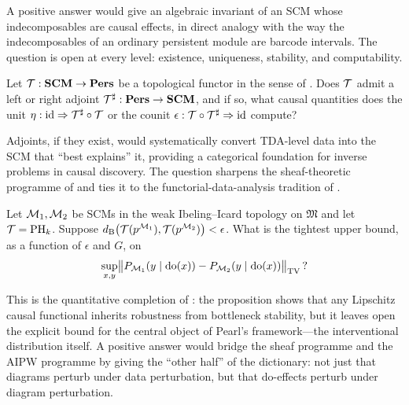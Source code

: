 A positive answer would give an algebraic invariant of an SCM whose
indecomposables are causal effects, in direct analogy with the way the
indecomposables of an ordinary persistent module are barcode intervals.
The question is open at every level: existence, uniqueness, stability,
and computability.

\begin{question}\label{q:adjoints}
Let $\mathcal{T} : \mathbf{SCM} \to \mathbf{Pers}$ be a topological functor in
the sense of . Does $\mathcal{T}$ admit a left or right adjoint
$\mathcal{T}^\sharp : \mathbf{Pers} \to \mathbf{SCM}$, and if so, what causal
quantities does the unit
$\eta : \mathrm{id} \Rightarrow \mathcal{T}^\sharp \circ \mathcal{T}$ or the counit
$\epsilon : \mathcal{T} \circ \mathcal{T}^\sharp \Rightarrow \mathrm{id}$ compute?
\end{question}

Adjoints, if they exist, would systematically convert TDA-level data
into the SCM that ``best explains'' it, providing a categorical
foundation for inverse problems in causal discovery. The question
sharpens the sheaf-theoretic programme of \citet{mahadevan2021causal,
mahadevan2022universal,mahadevan2025sheaf} and ties it to the
functorial-data-analysis tradition of \citet{spivak2014category,
curry2014sheaves,hajij2023topological}.

\begin{question}\label{q:causal-stability}
Let $\mathcal{M}_1, \mathcal{M}_2$ be SCMs in the weak Ibeling--Icard topology on
$\mathfrak{M}$ and let $\mathcal{T} = \mathrm{PH}_{k}$. Suppose
$d_{\mathrm{B}}\bigl(\mathcal{T}(p^{\mathcal{M}_1}), \mathcal{T}(p^{\mathcal{M}_2})\bigr) < \epsilon$. What is the
tightest upper bound, as a function of $\epsilon$ and $G$, on
\[
\sup_{x,y} \bigl\lVert P_{\mathcal{M}_1}(y \mid \mathrm{do}(x))
                    - P_{\mathcal{M}_2}(y \mid \mathrm{do}(x)) \bigr\rVert_{\mathrm{TV}}\,?
\]
\end{question}

This is the quantitative completion of :
the proposition shows that any Lipschitz causal functional inherits
robustness from bottleneck stability, but it leaves open the explicit
bound for the central object of Pearl's framework---the interventional
distribution itself. A positive answer would bridge the sheaf
programme \citep{mahadevan2025sheaf} and the AIPW programme
\citep{kim2026topological,chernozhukov2018double} by giving the
``other half'' of the dictionary: not just that diagrams perturb under
data perturbation, but that do-effects perturb under diagram
perturbation.

